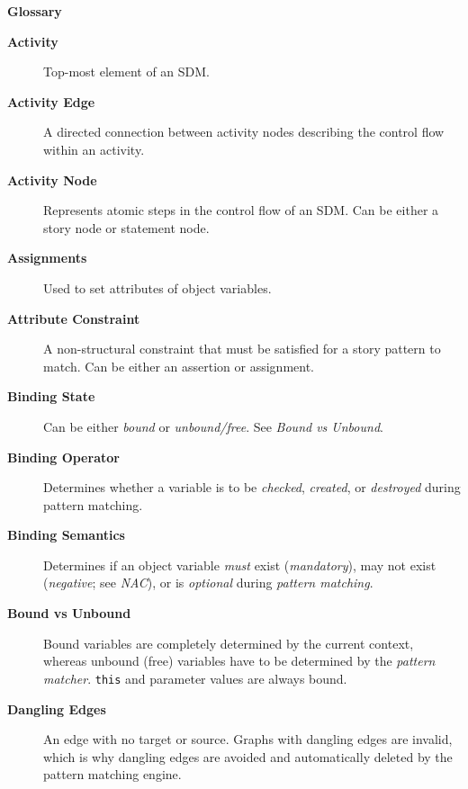 \newpage
{}
{}
\hypertarget{glossary}{}

\vspace{1cm}
{\Huge \bf Glossary}
\vspace{1cm}


\begin{description}

\item[\bf Activity]
Top-most element of an SDM.

\item[\bf Activity Edge]
A directed connection between activity nodes describing the control flow within an activity.

\item[\bf Activity Node]
Represents atomic steps in the control flow of an SDM. Can be either a story node or statement node.

\item[\bf Assignments]
Used to set attributes of object variables.

\item[\bf Attribute Constraint]
A non-structural constraint that must be satisfied for a story pattern to match. Can be either an assertion or assignment.

\item[\bf Binding State]
Can be either \emph{bound} or \emph{unbound/free}. See \emph{Bound vs Unbound}.

\item[\bf Binding Operator]
Determines whether a variable is to be \emph{checked}, \emph{created}, or \emph{destroyed} during pattern matching.

\item[\bf Binding Semantics]
Determines if an object variable \emph{must} exist (\emph{mandatory}), may not exist (\emph{negative}; see \emph{NAC}), or is \emph{optional} during
\emph{pattern matching}.

\item[\bf Bound vs Unbound]
Bound variables are completely determined by the current context, whereas unbound (free) variables have to be determined by the \emph{pattern matcher}.
\texttt{this} and parameter values are always bound.

\item[\bf Dangling Edges]
An edge with no target or source. Graphs with dangling edges are invalid, which is why dangling edges are avoided and automatically deleted by the pattern
matching engine.


\end{description}
